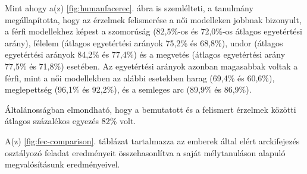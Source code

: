 \documentclass[12pt,a4]{article}
\begin{document}
            Mint ahogy a(z) \ref{fig:humanfacerec}. ábra is szemlélteti, a tanulmány megállapította, hogy az érzelmek felismerése a női modelleken jobbnak bizonyult,
            a férfi modellekhez képest a szomorúság (82,5\%-os és 72,0\%-os átlagos egyetértési arány),
            félelem (átlagos egyetértési arányok 75,2\% és 68,8\%), undor (átlagos egyetértési arányok
            84,2\% és 77,4\%) és a megvetés (átlagos egyetértési arány 77,5\% és 71,8\%) esetében. Az egyetértési arányok azonban magasabbak voltak a férfi, mint a női modellekben az alábbi esetekben
            harag (69,4\% és 60,6\%), meglepettség (96,1\% és 92,2\%),
            és a semleges arc (89,9\% és 86,9\%). 
        
            Általánosságban elmondható, hogy a bemutatott és a felismert érzelmek közötti átlagos százalékos egyezés
            82\% volt.
    
            A(z) \ref{fig:fec-comparison}. táblázat tartalmazza az emberek által elért arckifejezés osztályozó feladat eredményeit összehasonlítva a saját mélytanuláson alapuló megvalósításunk eredményeivel.
    
\end{document}
